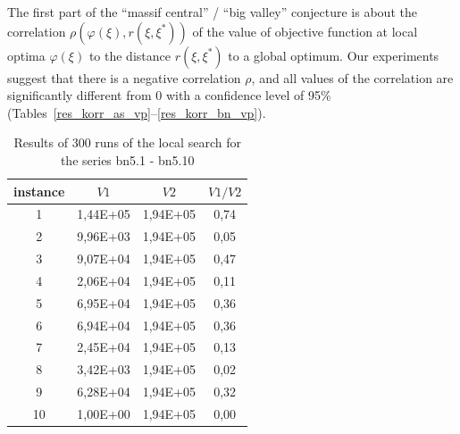 \documentclass{ifacconf}
\begin{document}
The first part of the ``massif central'' / ``big valley'' conjecture is about the correlation $\rho(\varphi(\xi),r(\xi,\xi^*))$ of the value of 
objective function at local optima $\varphi(\xi)$
to the distance $r(\xi,\xi^*)$ to a global optimum. 
Our experiments suggest that there is a negative correlation $\rho$, and all values of the
correlation are significantly different from 0 with a confidence level of 95\% (Tables~\ref{res_korr_as_vp}--\ref{res_korr_bn_vp}).
\begin{table}[h!]
	\vspace{1cm}
	\centering
	\begin{tabular}{|c|c|c|c|}
		\hline
		\hspace*{0.1cm}instance \hspace*{0.1cm} &
		\hspace*{0.1cm}$V1$\hspace*{0.1cm}&
		\hspace*{0.1cm}$V2$\hspace*{0.1cm}&
		\hspace*{0.1cm}$V1/V2$\hspace*{0.1cm}\\
		\hline
		1 &  1,44E+05  &  1,94E+05  &  0,74\\
		2 &  9,96E+03  &  1,94E+05  &  0,05\\
		3 &  9,07E+04  &  1,94E+05  &  0,47\\
		4 &  2,06E+04  &  1,94E+05  &  0,11\\
		5 &  6,95E+04  &  1,94E+05  &  0,36\\
		6 &  6,94E+04  &  1,94E+05  &  0,36\\
		7 &  2,45E+04  &  1,94E+05  &  0,13\\
		8 &  3,42E+03  &  1,94E+05  &  0,02\\
		9 &  6,28E+04  &  1,94E+05  &  0,32\\
		10&  1,00E+00  &  1,94E+05  &  0,00\\
		\hline
	\end{tabular}
	\vspace{1em}
	\caption{Results of 300 runs of the local search  for the series bn5.1 - bn5.10}	\label{spher_bn}
\end{table}
\end{document}
